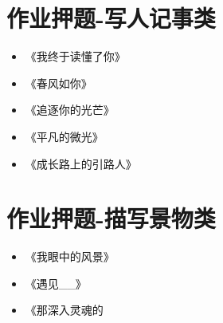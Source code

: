 \chapter{作业押题-写人记事类}

\begin{itemize}
    \item 《我终于读懂了你》
    \item 《春风如你》
    \item 《追逐你的光芒》
    \item 《平凡的微光》
    \item 《成长路上的引路人》
\end{itemize}


\chapter{作业押题-描写景物类}

\begin{itemize}
    \item 《我眼中的风景》
    \item 《遇见\_\_》
    \item 《那深入灵魂的
\end{itemize}


